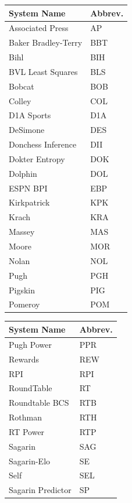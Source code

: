 \documentclass[]{article}
\begin{document}
\begin{table}[ht]
\centering
\begin{tabular}{@{}ll@{}}
\toprule
System Name         & Abbrev.   \\ \midrule
Associated Press    & AP  \\
Baker Bradley-Terry & BBT \\
Bihl                & BIH \\
BVL Least Squares   & BLS \\
Bobcat              & BOB \\
Colley              & COL \\
D1A Sports          & D1A \\
DeSimone            & DES \\
Donchess Inference  & DII \\
Dokter Entropy      & DOK \\
Dolphin             & DOL \\
ESPN BPI            & EBP \\
Kirkpatrick         & KPK \\
Krach               & KRA \\
Massey              & MAS \\
Moore               & MOR \\
Nolan               & NOL \\
Pugh                & PGH \\
Pigskin             & PIG \\
Pomeroy             & POM \\
\bottomrule
\end{tabular}
\hspace{1em}
\begin{tabular}{@{}ll@{}}
\toprule
System Name         & Abbrev.   \\ \midrule
Pugh Power          & PPR \\
Rewards             & REW \\
RPI                 & RPI \\
RoundTable          & RT  \\
Roundtable BCS      & RTB \\
Rothman             & RTH \\
RT Power            & RTP \\
Sagarin             & SAG \\
Sagarin-Elo         & SE  \\
Self                & SEL \\
Sagarin Predictor   & SP  \\

\end{tabular}
\end{table}
\end{document}
